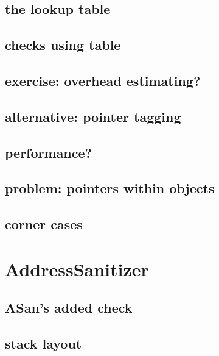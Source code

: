 \subsection{the lookup table}


\subsection{checks using table}


\subsection{exercise: overhead estimating?}


\subsection{alternative: pointer tagging}


\subsection{performance?}


\subsection{problem: pointers within objects}


\subsection{corner cases}


\section{AddressSanitizer}


\subsection{ASan's added check}


\subsection{stack layout}





